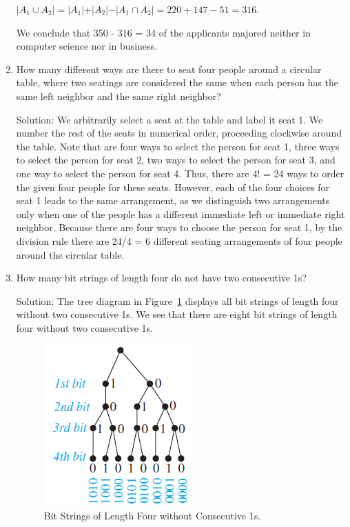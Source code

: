 \documentclass[11pt,a4paper]{book}
\begin{document}
\begin{enumerate}[label=Example~\arabic*]
$|A_1 \cup A_2\mid = |A_1| + |A_2| - |A_1 \cap A_2| = 220 + 147 - 51 = 316$.

We conclude that 350 - 316 = 34 of the applicants majored neither in computer science nor in business.

\item How many different ways are there to seat four people around a circular table, where two seatings are considered the same when each person has the same left neighbor and the same right neighbor?

Solution: We arbitrarily select a seat at the table and label it seat 1.
We number the rest of the seats in numerical order, proceeding clockwise around the table.
Note that are four ways to select the person for seat 1, three ways to select the person for seat 2, two ways to select the person for seat 3, and one way to select the person for seat 4.
Thus, there are 4! = 24 ways to order the given four people for these seats.
However, each of the four choices for seat 1 leads to the same arrangement, as we distinguish two arrangements only when one of the people has a different immediate left or immediate right neighbor.
Because there are four ways to choose the person for seat 1, by the division rule there are 24/4 = 6 different seating arrangements of four people around the circular table.

\item How many bit strings of length four do not have two consecutive 1s?

Solution: The tree diagram in Figure~\ref{fig:ex21} displays all bit strings of length four without two consecutive 1s.
We see that there are eight bit strings of length four without two consecutive 1s.

\begin{figure}[h]
\centering
\includegraphics{images/exemplo21.png}
\caption{Bit Strings of Length Four without Consecutive 1s.}
\label{fig:ex21}
\end{figure}


\end{enumerate}
\end{document}
